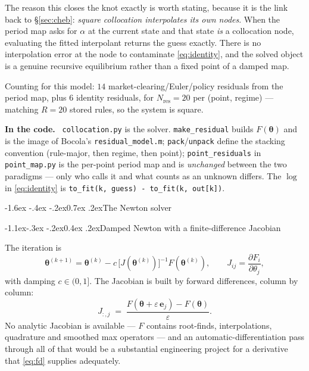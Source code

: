 \documentclass[10pt,a4paper]{article}
\makeatletter
\theoremstyle{definition}
\theoremstyle{plain}
\theoremstyle{remark}
\newenvironment{codehint}%
  {\par\vspace{2pt}\begin{framed}\noindent\small\textcolor{codeblue}{\textbf{In the code.}}\ }%
  {\end{framed}\vspace{2pt}}
\newcommand{\file}[1]{\textcolor{codeblue}{\texttt{#1}}}
\newcommand{\code}[1]{\texttt{#1}}
\newcommand{\pol}{\bm{\theta}}
\renewcommand\section{\@startsection{section}{1}{\z@}%
  {-1.6ex \@plus -.4ex \@minus -.2ex}{0.7ex \@plus.2ex}{\normalfont\large\bfseries}}
\renewcommand\subsection{\@startsection{subsection}{2}{\z@}%
  {-1.1ex\@plus -.3ex \@minus -.2ex}{0.4ex \@plus .2ex}{\normalfont\normalsize\bfseries}}
\makeatother
\begin{document}
The reason this closes the knot exactly is worth stating, because it is the link back to
\S\ref{sec:cheb}: \emph{square collocation interpolates its own nodes}. When the period map
asks for $\alpha$ at the current state and that state \emph{is} a collocation node,
evaluating the fitted interpolant returns the guess exactly. There is no interpolation error
at the node to contaminate \eqref{eq:identity}, and the solved object is a genuine recursive
equilibrium rather than a fixed point of a damped map.

Counting for this model: $14$ market-clearing/Euler/policy residuals from the period map,
plus $6$ identity residuals, for $N_{\mathrm{res}}=20$ per (point, regime) --- matching
$R=20$ stored rules, so the system is square.

\begin{codehint}
\file{collocation.py} is the solver. \code{make\_residual} builds $F(\pol)$ and is the image
of Bocola's \code{residual\_model.m}; \code{pack}/\code{unpack} define the stacking
convention (rule-major, then regime, then point); \code{point\_residuals} in
\file{point\_map.py} is the per-point period map and is \emph{unchanged} between the two
paradigms --- only who calls it and what counts as an unknown differs. The $\log$ in
\eqref{eq:identity} is \code{to\_fit(k, guess) - to\_fit(k, out[k])}.
\end{codehint}

\section{The Newton solver}
\label{sec:newton}

\subsection{Damped Newton with a finite-difference Jacobian}

The iteration is
\begin{equation}
  \pol^{(k+1)} = \pol^{(k)} - c\,\big[J(\pol^{(k)})\big]^{-1} F(\pol^{(k)}),
  \qquad J_{ij} = \frac{\partial F_i}{\partial \theta_j},
  \label{eq:newton}
\end{equation}
with damping $c\in(0,1]$. The Jacobian is built by forward differences, column by column:
\begin{equation}
  J_{:,j} \;=\; \frac{F(\pol + \varepsilon\,\bm{e}_j) - F(\pol)}{\varepsilon}.
  \label{eq:fd}
\end{equation}
No analytic Jacobian is available --- $F$ contains root-finds, interpolations, quadrature and
smoothed max operators --- and an automatic-differentiation pass through all of that would be
a substantial engineering project for a derivative that \eqref{eq:fd} supplies adequately.
\end{document}
